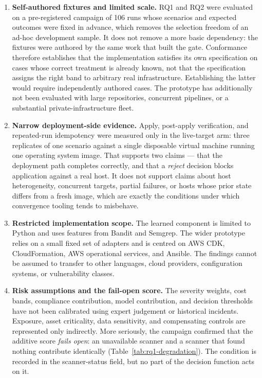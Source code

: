 \begin{enumerate}
    \item \textbf{Self-authored fixtures and limited scale.} RQ1 and RQ2 were
    evaluated on a pre-registered campaign of 106 runs whose scenarios and
    expected outcomes were fixed in advance, which removes the selection
    freedom of an ad-hoc development sample. It does not remove a more basic
    dependency: the fixtures were authored by the same work that built the
    gate. Conformance therefore establishes that the implementation satisfies
    its own specification on cases whose correct treatment is already known,
    not that the specification assigns the right band to arbitrary real
    infrastructure. Establishing the latter would require independently
    authored cases. The prototype has
    additionally not been evaluated with large repositories, concurrent
    pipelines, or a substantial private-infrastructure fleet.

    \item \textbf{Narrow deployment-side evidence.} Apply, post-apply
    verification, and repeated-run idempotency were measured only in the
    live-target arm: three replicates of one scenario against a single
    disposable virtual machine running one operating system image. That
    supports two claims --- that the deployment path completes correctly, and
    that a \emph{reject} decision blocks application against a real host. It
    does not support claims about host heterogeneity, concurrent targets,
    partial failures, or hosts whose prior state differs from a fresh image,
    which are exactly the conditions under which convergence tooling tends to
    misbehave.

    \item \textbf{Restricted implementation scope.} The learned component is limited to
    Python and uses features from Bandit and Semgrep. The wider prototype relies on a
    small fixed set of adapters and is centred on AWS CDK, CloudFormation, AWS operational
    services, and Ansible. The findings cannot be assumed to transfer to other languages,
    cloud providers, configuration systems, or vulnerability classes.

    \item \textbf{Risk assumptions and the fail-open score.} The severity weights,
    cost bands, compliance contribution, model contribution, and decision
    thresholds have not been calibrated using expert judgement or historical
    incidents. Exposure, asset criticality, data sensitivity, and compensating
    controls are represented only indirectly. More seriously, the campaign
    confirmed that the additive score \emph{fails open}: an unavailable scanner
    and a scanner that found nothing contribute identically
    (Table~\ref{tab:rq1-degradation}). The condition is recorded in the
    scanner-status field, but no part of the decision function acts on it.


\end{enumerate}
